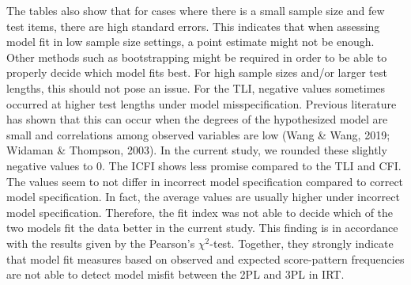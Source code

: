 \documentclass[Royal,sageapa,times,doublespace]{sagej}
\begin{document}
\indent The tables also show that for cases where there is a small sample size and few test items, there are high standard errors. This indicates that when assessing model fit in low sample size settings, a point estimate might not be enough. Other methods such as bootstrapping might be required in order to be able to properly decide which model fits best. For high sample sizes and/or larger test lengths, this should not pose an issue. For the TLI, negative values sometimes occurred at higher test lengths under model misspecification. Previous literature has shown that this can occur when the degrees of the hypothesized model are small and correlations among observed variables are low (Wang \& Wang, 2019; Widaman \& Thompson, 2003). In the current study, we rounded these slightly negative values to 0. 
\newpage
\indent The ICFI shows less promise compared to the TLI and CFI. The values seem to not differ in incorrect model specification compared to correct model specification. In fact, the average values are usually higher under incorrect model specification. Therefore, the fit index was not able to decide which of the two models fit the data better in the current study. This finding is in accordance with the results given by the Pearson's $\chi^2$-test. Together, they strongly indicate that model fit measures based on observed and expected score-pattern frequencies are not able to detect model misfit between the 2PL and 3PL in IRT. \\
\end{document}
